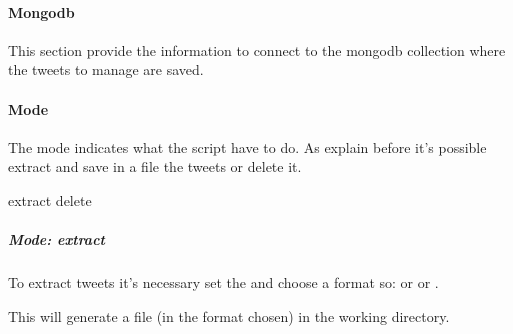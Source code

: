 \documentclass[letterpaper,10pt,english]{sphinxmanual}
\begin{document}
\paragraph{Mongodb}
\label{\detokenize{guide/manage_tweets_guide:mongodb}}
\begin{sphinxVerbatim}[commandchars=\\\{\}]
     
\end{sphinxVerbatim}

\sphinxAtStartPar
This section provide the information to connect to the mongodb collection where the tweets to manage are saved.


\paragraph{Mode}
\label{\detokenize{guide/manage_tweets_guide:mode}}
\begin{sphinxVerbatim}[commandchars=\\\{\}]
    
\end{sphinxVerbatim}

\begin{DUlineblock}{0em}
\item[] The mode indicates what the script have to do. As explain before it’s possible extract and save in a file the tweets or delete it.
\item[]  extract delete
\item[] 
\end{DUlineblock}


\subparagraph{Mode: extract}
\label{\detokenize{guide/manage_tweets_guide:mode-extract}}
\begin{sphinxVerbatim}[commandchars=\\\{\}]
   
\end{sphinxVerbatim}

\begin{DUlineblock}{0em}
\item[] To extract tweets it’s necessary set the  and choose a format so: or  or .
\item[] This will generate a file (in the format chosen) in the working directory.
\end{DUlineblock}
\end{document}
